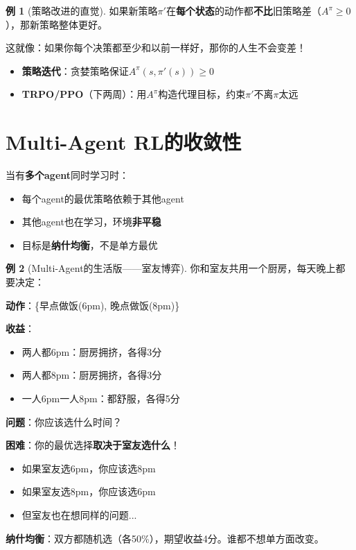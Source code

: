 \documentclass[11pt,a4paper]{article}
\theoremstyle{definition}
\newtheorem{example}{例}[section]
\begin{document}
\begin{example}[策略改进的直觉]
如果新策略$\pi'$在\textbf{每个状态}的动作都\textbf{不比}旧策略差（$A^\pi \geq 0$），那新策略整体更好。

这就像：如果你每个决策都至少和以前一样好，那你的人生不会变差！
\end{example}

\begin{keypoint}
\begin{itemize}
    \item \textbf{策略迭代}：贪婪策略保证$A^\pi(s, \pi'(s)) \geq 0$
    \item \textbf{TRPO/PPO}（下两周）：用$A^\pi$构造代理目标，约束$\pi'$不离$\pi$太远
\end{itemize}
\end{keypoint}

\section{Multi-Agent RL的收敛性}

\begin{plainwords}
当有\textbf{多个agent}同时学习时：
\begin{itemize}
    \item 每个agent的最优策略依赖于其他agent
    \item 其他agent也在学习，环境\textbf{非平稳}
    \item 目标是\textbf{纳什均衡}，不是单方最优
\end{itemize}
\end{plainwords}

\begin{example}[Multi-Agent的生活版——室友博弈]
你和室友共用一个厨房，每天晚上都要决定：

\textbf{动作}：\{早点做饭(6pm), 晚点做饭(8pm)\}

\textbf{收益}：
\begin{itemize}
    \item 两人都6pm：厨房拥挤，各得3分
    \item 两人都8pm：厨房拥挤，各得3分
    \item 一人6pm一人8pm：都舒服，各得5分
\end{itemize}

\textbf{问题}：你应该选什么时间？

\textbf{困难}：你的最优选择\textbf{取决于室友选什么}！
\begin{itemize}
    \item 如果室友选6pm，你应该选8pm
    \item 如果室友选8pm，你应该选6pm
    \item 但室友也在想同样的问题...
\end{itemize}

\textbf{纳什均衡}：双方都随机选（各50\%），期望收益4分。谁都不想单方面改变。
\end{example}
\end{document}
